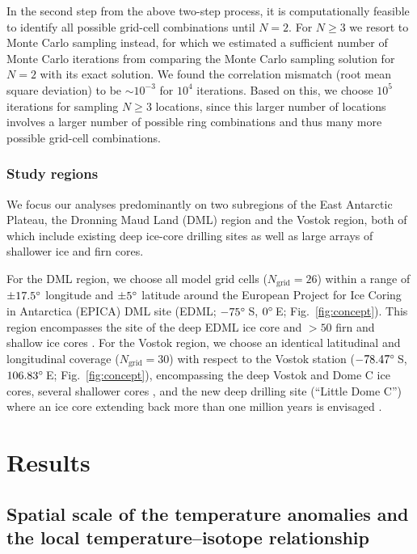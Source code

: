 \documentclass[cp, manuscript]{copernicus}
\begin{document}
In the second step from the above two-step process, it is computationally
feasible to identify all possible grid-cell combinations until $N=2$. For
$N\geq3$ we resort to Monte Carlo sampling instead, for which we estimated a
sufficient number of Monte Carlo iterations from comparing the Monte Carlo
sampling solution for $N=2$ with its exact solution. We found the correlation
mismatch (root mean square deviation) to be $\sim10^{-3}$ for $10^4$
iterations. Based on this, we choose $10^5$ iterations for sampling $N\geq3$
locations, since this larger number of locations involves a larger number of
possible ring combinations and thus many more possible grid-cell combinations.

\subsubsection{Study regions}\label{methods:regions}

We focus our analyses predominantly on two subregions of the East Antarctic
Plateau, the Dronning Maud Land (DML) region and the Vostok region, both of
which include existing deep ice-core drilling sites as well as large arrays of
shallower ice and firn cores.

For the DML region, we choose all model grid cells ($N_{\mathrm{grid}}=26$)
within a range of $\pm17.5^{\circ}$ longitude and $\pm5^{\circ}$ latitude around
the European Project for Ice Coring in Antarctica (EPICA) DML site (EDML;
$-75^{\circ}$\,S, $0^{\circ}$\,E; Fig.~\ref{fig:concept}). This region encompasses
the site of the deep EDML ice core \citep{EPICAcommunitymembers2006} and $>50$
firn and shallow ice cores \citep{Altnau2015}. For the Vostok region, we choose
an identical latitudinal and longitudinal coverage ($N_{\mathrm{grid}}=30$) with
respect to the Vostok station ($-78.47^{\circ}$\,S, $106.83^{\circ}$\,E;
Fig.~\ref{fig:concept}), encompassing the deep Vostok and Dome C ice cores,
several shallower cores \citep{Stenni2017}, and the new deep drilling site
(``Little Dome C'') where an ice core extending back more than one million years
is envisaged \citep{Passalacqua2018}.

\section{Results}\label{results}

\subsection{Spatial scale of the temperature anomalies and the local
  temperature--isotope relationship}
\label{results:t2m-iso}
\end{document}
